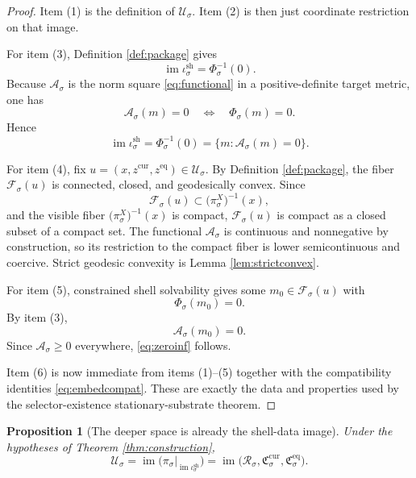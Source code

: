 \documentclass[11pt]{article}
\newcommand{\Reduction}[1]{\mathcal R_{#1}}
\newcommand{\CurrentCarrier}[1]{\mathfrak C_{#1}^{\mathrm{cur}}}
\newcommand{\EqCarrier}[1]{\mathfrak C_{#1}^{\mathrm{eq}}}
\newcommand{\DataProj}[1]{\pi_{#1}}
\newcommand{\SubVisible}[1]{\pi_{#1}^{X}}
\newcommand{\ShellEquation}[1]{\Phi_{#1}}
\newcommand{\Fiber}[1]{\mathcal F_{#1}}
\newcommand{\ShellEmbed}[1]{\iota_{#1}^{\mathrm{sh}}}
\newcommand{\StationaryFunctional}[1]{\mathscr A_{#1}}
\newcommand{\DeepSpace}[1]{\mathcal U_{#1}}
\newtheorem{proposition}{Proposition}
\begin{document}
\begin{proof}
Item (1) is the definition of \(\DeepSpace{\sigma}\). Item (2) is then just coordinate restriction on that image.

For item (3), Definition \ref{def:package} gives
\[
\operatorname{im}\ShellEmbed{\sigma}
=
\ShellEquation{\sigma}^{-1}(0).
\]
Because \(\StationaryFunctional{\sigma}\) is the norm square \eqref{eq:functional} in a positive-definite target metric, one has
\[
\StationaryFunctional{\sigma}(m)=0
\quad\Longleftrightarrow\quad
\ShellEquation{\sigma}(m)=0.
\]
Hence
\[
\operatorname{im}\ShellEmbed{\sigma}
=
\ShellEquation{\sigma}^{-1}(0)
=
\{m:\StationaryFunctional{\sigma}(m)=0\}.
\]

For item (4), fix \(u=(x,z^{\mathrm{cur}},z^{\mathrm{eq}})\in\DeepSpace{\sigma}\). By Definition \ref{def:package}, the fiber \(\Fiber{\sigma}(u)\) is connected, closed, and geodesically convex. Since
\[
\Fiber{\sigma}(u)\subset \bigl(\SubVisible{\sigma}\bigr)^{-1}(x),
\]
and the visible fiber \(\bigl(\SubVisible{\sigma}\bigr)^{-1}(x)\) is compact, \(\Fiber{\sigma}(u)\) is compact as a closed subset of a compact set. The functional \(\StationaryFunctional{\sigma}\) is continuous and nonnegative by construction, so its restriction to the compact fiber is lower semicontinuous and coercive. Strict geodesic convexity is Lemma \ref{lem:strictconvex}.

For item (5), constrained shell solvability gives some \(m_{0}\in\Fiber{\sigma}(u)\) with
\[
\ShellEquation{\sigma}(m_{0})=0.
\]
By item (3),
\[
\StationaryFunctional{\sigma}(m_{0})=0.
\]
Since \(\StationaryFunctional{\sigma}\ge 0\) everywhere, \eqref{eq:zeroinf} follows.

Item (6) is now immediate from items (1)--(5) together with the compatibility identities \eqref{eq:embedcompat}. These are exactly the data and properties used by the selector-existence stationary-substrate theorem.
\end{proof}

\begin{proposition}[The deeper space is already the shell-data image]
\label{prop:shellimage}
Under the hypotheses of Theorem \ref{thm:construction},
\begin{equation}
\DeepSpace{\sigma}
=
\operatorname{im}\bigl(\DataProj{\sigma}|_{\operatorname{im}\ShellEmbed{\sigma}}\bigr)
=
\operatorname{im}
\bigl(
\Reduction{\sigma},
\CurrentCarrier{\sigma},
\EqCarrier{\sigma}
\bigr).
\label{eq:shellimage}
\end{equation}
\end{proposition}
\end{document}
